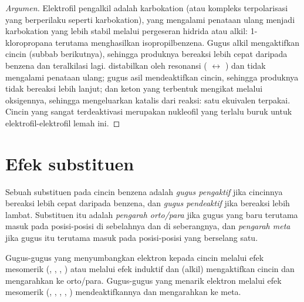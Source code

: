 \begin{proof}[Argumen]
Elektrofil pengalkil adalah karbokation (atau kompleks terpolarisasi yang
berperilaku seperti karbokation), yang mengalami penataan ulang menjadi
karbokation yang lebih stabil melalui pergeseran hidrida atau alkil:
1-kloropropana terutama menghasilkan isopropilbenzena. Gugus alkil
mengaktifkan cincin (subbab berikutnya), sehingga produknya bereaksi lebih
cepat daripada benzena dan teralkilasi lagi.  distabilkan oleh
resonansi ( $\leftrightarrow$ ) dan tidak mengalami
penataan ulang; gugus asil mendeaktifkan cincin, sehingga produknya tidak
bereaksi lebih lanjut; dan keton yang terbentuk mengikat  melalui
oksigennya, sehingga mengeluarkan katalis dari reaksi: satu ekuivalen
terpakai. Cincin yang sangat terdeaktivasi merupakan nukleofil yang terlalu
buruk untuk elektrofil-elektrofil lemah ini.
\end{proof}

\section{Efek substituen}

\begin{definition}\label{def:b2:aromatic-substitution:directing}
Sebuah substituen pada cincin benzena adalah \emph{gugus pengaktif}
jika cincinnya bereaksi lebih cepat daripada benzena, dan \emph{gugus
pendeaktif} jika bereaksi lebih lambat. Substituen
itu adalah \emph{pengarah orto/para} jika gugus
yang baru terutama masuk pada posisi-posisi di sebelahnya dan di
seberangnya, dan \emph{pengarah meta} jika gugus itu
terutama masuk pada posisi-posisi yang berselang satu.
\end{definition}

\begin{proposition}\label{prop:b2:aromatic-substitution:directing}
Gugus-gugus yang menyumbangkan elektron kepada cincin melalui efek mesomerik
(, , ,
) atau melalui efek induktif dan  (alkil)
mengaktifkan cincin dan mengarahkan ke orto/para. Gugus-gugus yang menarik
elektron melalui efek mesomerik (, , ,
, ) mendeaktifkannya dan mengarahkan ke meta.
\end{proposition}

